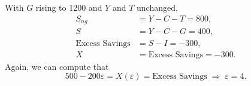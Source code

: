 \documentclass{article}
\begin{document}
\subsection{}
With $G$ rising to 1200 and $Y$ and $T$ unchanged, 
\begin{align*}
    S_{ng} &= Y - C - T = 800, \\
    S & = Y - C - G = 400, \\
    \text{Excess Savings} &= S - I = -300, \\
    X &= \text{Excess Savings} = -300.
\end{align*}
Again, we can compute that
\[
    500 - 200 \varepsilon = X(\varepsilon) = \text{Excess Savings}
    \;\Longrightarrow\;
    \varepsilon = 4.
\]
\end{document}
